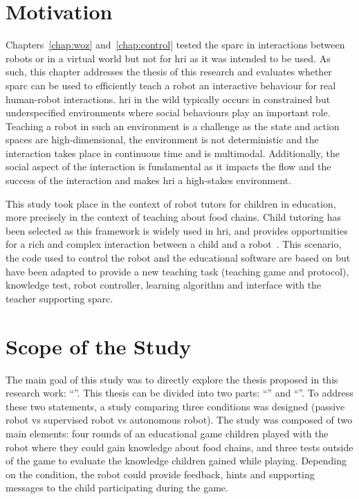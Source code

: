 \newpage

\section{Motivation}

Chapters~\ref{chap:woz} and~\ref{chap:control} tested the \gls{sparc} in interactions between robots or in a virtual world but not for \gls{hri} as it was intended to be used. As such, this chapter addresses the thesis of this research and evaluates whether \gls{sparc} can be used to efficiently teach a robot an interactive behaviour for real human-robot interactions. \gls{hri} in the wild typically occurs in constrained but underspecified environments where social behaviours play an important role. Teaching a robot in such an environment is a challenge as the state and action spaces are high-dimensional, the environment is not deterministic and the interaction takes place in continuous time and is multimodal. Additionally, the social aspect of the interaction is fundamental as it impacts the flow and the success of the interaction and makes \gls{hri} a high-stakes environment.

This study took place in the context of robot tutors for children in education, more precisely in the context of teaching about food chains. Child tutoring has been selected as this framework is widely used in \gls{hri}, and provides opportunities for a rich and complex interaction between a child and a robot~\citep{leyzberg2012physical,kennedy2015robot,belpaeme2018social}. This scenario, the code used to control the robot and the educational software are based on \cite{lemaignan2018pinsoro} but have been adapted to provide a new teaching task (teaching game and protocol), knowledge test, robot controller, learning algorithm and interface with the teacher supporting \gls{sparc}.

\section{Scope of the Study} \label{sec:tutoring_scope}

The main goal of this study was to directly explore the thesis proposed in this research work: ``\thesis''. This thesis can be divided into two parts: ``\QI'' and ``\QII''. To address these two statements, a study comparing three conditions was designed (passive robot vs supervised robot vs autonomous robot). The study was composed of two main elements: four rounds of an educational game children played with the robot where they could gain knowledge about food chains, and three tests outside of the game to evaluate the knowledge children gained while playing. Depending on the condition, the robot could provide feedback, hints and supporting messages to the child participating during the game. 

